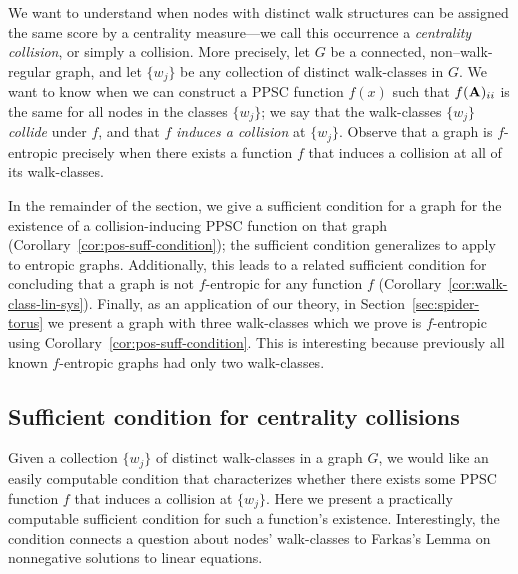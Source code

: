 We want to understand when nodes with distinct walk structures can be assigned the same score by a centrality measure---we call this occurrence a \emph{centrality collision}, or simply a collision.
More precisely, let $G$ be a connected, non--walk-regular graph, and let $\{w_j\}$ be any collection of distinct walk-classes in $G$.
We want to know when we can construct a PPSC function $f(x)$ such that $f(\textbf{A})_{ii}$ is the same for all nodes in the classes $\{w_j\}$;
we say that the walk-classes $\{w_j\}$ \emph{collide} under $f$, and that $f$ \emph{induces a collision} at $\{w_j\}$.
Observe that a graph is $f$-entropic precisely when there exists a function $f$ that induces a collision at all of its walk-classes.

In the remainder of the section, we give a sufficient condition for a graph for the existence of a collision-inducing PPSC function on that graph (Corollary~\ref{cor:pos-suff-condition});
the sufficient condition generalizes to apply to entropic graphs.
Additionally, this leads to a related sufficient condition for concluding that a graph is not $f$-entropic for any function $f$ (Corollary~\ref{cor:walk-class-lin-sys}).
Finally, as an application of our theory, in Section~\ref{sec:spider-torus} we present a graph with three walk-classes which we prove is $f$-entropic using Corollary~\ref{cor:pos-suff-condition}.
This is interesting because previously all known $f$-entropic graphs had only two walk-classes.

\subsection{Sufficient condition for centrality collisions}\label{sec:suff-condition}
Given a collection $\{w_j\}$ of distinct walk-classes in a graph $G$, we would like an easily computable condition that characterizes whether there exists some PPSC function $f$ that induces a collision at $\{w_j\}$.
Here we present a practically computable sufficient condition for such a function's existence.
Interestingly, the condition connects a question about nodes' walk-classes to Farkas's Lemma on nonnegative solutions to linear equations.

